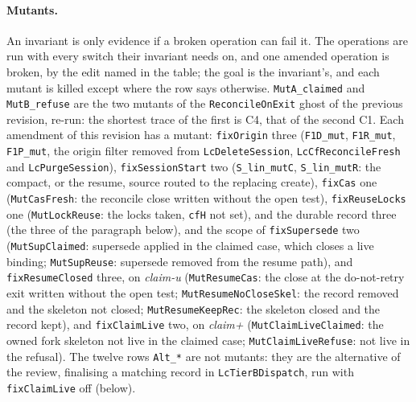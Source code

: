 \documentclass[a4paper,10pt,fleqn]{article}
\newcommand{\field}[1]{\texttt{#1}}
\begin{document}
\paragraph{Mutants.}
\label{sec:lc-mutants}
An invariant is only evidence if a broken operation can fail it. The
operations are run with every switch their invariant needs on, and one
amended operation is broken, by the edit named in the table; the goal is the
invariant's, and each mutant is killed except where the row says otherwise.
\texttt{MutA\_claimed} and \texttt{MutB\_refuse} are the two mutants of the
\field{ReconcileOnExit} ghost of the previous revision, re-run: the shortest
trace of the first is C4, that of the second C1. Each amendment of this revision has a mutant:
\field{fixOrigin} three (\texttt{F1D\_mut}, \texttt{F1R\_mut},
\texttt{F1P\_mut}, the origin filter removed from \field{LcDeleteSession},
\field{LcCfReconcileFresh} and \field{LcPurgeSession}),
\field{fixSessionStart} two (\texttt{S\_lin\_mutC}, \texttt{S\_lin\_mutR}: the
compact, or the resume, source routed to the replacing create),
\field{fixCas} one (\texttt{MutCasFresh}: the reconcile close written without
the open test), \field{fixReuseLocks} one (\texttt{MutLockReuse}: the locks
taken, \field{cfH} not set), and the durable record three (the three of the paragraph below), and the scope of \field{fixSupersede} two
(\texttt{MutSupClaimed}: supersede applied in the claimed case, which closes a
live binding; \texttt{MutSupReuse}: supersede removed from the resume path),
and \field{fixResumeClosed} three, on \emph{claim-u} (\texttt{MutResumeCas}:
the close at the do-not-retry exit written without the open test;
\texttt{MutResumeNoCloseSkel}: the record removed and the skeleton not
closed; \texttt{MutResumeKeepRec}: the skeleton closed and the record kept),
and \field{fixClaimLive} two, on \emph{claim+} (\texttt{MutClaimLiveClaimed}:
the owned fork skeleton not live in the claimed case;
\texttt{MutClaimLiveRefuse}: not live in the refusal). The twelve rows
\texttt{Alt\_*} are not mutants: they are the alternative of the review,
finalising a matching record in \field{LcTierBDispatch}, run with
\field{fixClaimLive} off (below).
\end{document}
